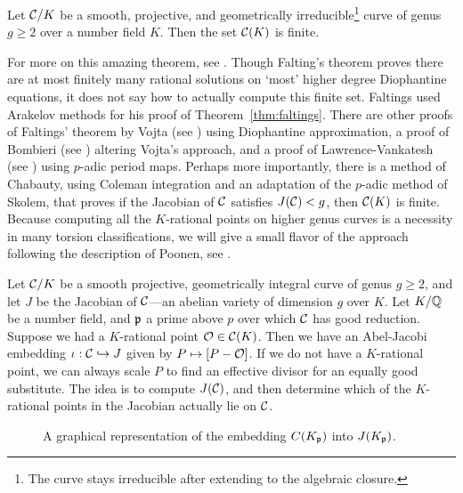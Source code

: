 \begin{thm} \label{thm:faltings}
Let $\mathcal{C}/K$ be a smooth, projective, and geometrically irreducible\footnote{The curve stays irreducible after extending to the algebraic closure.} curve of genus $g \geq 2$ over a number field $K$. Then the set $\mathcal{C}(K)$ is finite. 
\end{thm}


For more on this amazing theorem, see \cite{snowdenbhatt16}. Though Falting's theorem proves there are at most finitely many rational solutions on `most' higher degree Diophantine equations, it does not say how to actually compute this finite set. Faltings used Arakelov methods for his proof of Theorem~\ref{thm:faltings}. There are other proofs of Faltings' theorem by Vojta (see \cite{vojta91}) using Diophantine approximation, a proof of Bombieri (see \cite{bombieri90}) altering Vojta's approach, and a proof of Lawrence-Vankatesh (see \cite{lawrencevankatesh20}) using $p$-adic period maps. Perhaps more importantly, there is a method of Chabauty, using Coleman integration and an adaptation of the $p$-adic method of Skolem, that proves if the Jacobian of $\mathcal{C}$ satisfies $J(\mathcal{C}) < g$, then $\mathcal{C}(K)$ is finite. Because computing all the $K$-rational points on higher genus curves is a necessity in many torsion classifications, we will give a small flavor of the approach following the description of Poonen, see \cite{poonen20}. 


Let $\mathcal{C}/K$ be a smooth projective, geometrically integral curve of genus $g \geq 2$, and let $J$ be the Jacobian of $\mathcal{C}$---an abelian variety of dimension $g$ over $K$. Let $K/\mathbb{Q}$ be a number field, and $\mathfrak{p}$ a prime above $p$ over which $\mathcal{C}$ has good reduction. Suppose we had a $K$-rational point $\mathcal{O} \in \mathcal{C}(K)$. Then we have an Abel-Jacobi embedding $\iota: \mathcal{C} \hookrightarrow J$ given by $P \mapsto [P - \mathcal{O}]$. If we do not have a $K$-rational point, we can always scale $P$ to find an effective divisor for an equally good substitute. The idea is to compute $J(\mathcal{C})$, and then determine which of the $K$-rational points in the Jacobian actually lie on $\mathcal{C}$. 


	\begin{figure}[!ht]
	\centering
	\caption{A graphical representation of the embedding $C(K_{\mathfrak{p}})$ into $J(K_{\mathfrak{p}})$.\label{fig:chab}}
	\end{figure}



